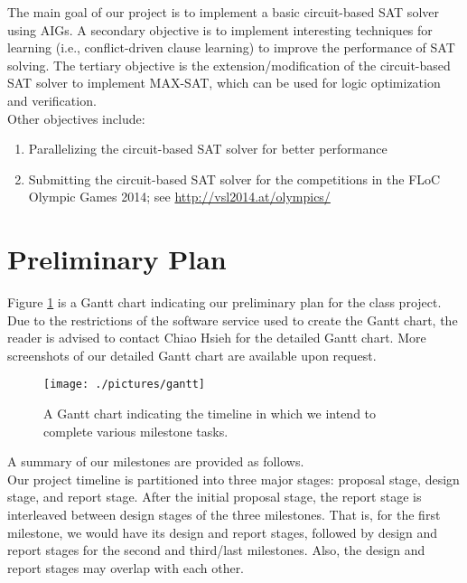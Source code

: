 \documentclass[letter,12pt]{article}
\begin{document}
The main goal of our project is to implement a basic circuit-based SAT solver using AIGs. A secondary objective is to implement interesting techniques for learning (i.e., conflict-driven clause learning) to improve the performance of SAT solving. The tertiary objective is the extension/modification of the circuit-based SAT solver to implement MAX-SAT, which can be used for logic optimization and verification. \\

Other objectives include: \vspace{-0.3cm}
\begin{enumerate} \itemsep -4pt
\item Parallelizing the circuit-based SAT solver for better performance
\item Submitting the circuit-based SAT solver for the competitions in the FLoC Olympic Games 2014; see \url{http://vsl2014.at/olympics/}
\end{enumerate}








\section{Preliminary Plan}
\label{sec:preliminaryplan}

Figure \ref{fig:gantt} is a Gantt chart indicating our preliminary plan for the class project. Due to the restrictions of the software service used to create the Gantt chart, the reader is advised to contact Chiao Hsieh for the detailed Gantt chart. More screenshots of our detailed Gantt chart are available upon request. \\

\begin{figure}
\centering 
\texttt{[image: ./pictures/gantt]}
\caption{A Gantt chart indicating the timeline in which we intend to complete various milestone tasks.}
\label{fig:gantt}
\end{figure}

A summary of our milestones are provided as follows. \\

Our project timeline is partitioned into three major stages: proposal stage, design stage, and report stage. After the initial proposal stage, the report stage is interleaved between design stages of the three milestones. That is, for the first milestone, we would have its design and report stages, followed by design and report stages for the second and third/last milestones. Also, the design and report stages may overlap with each other. \\
\end{document}
